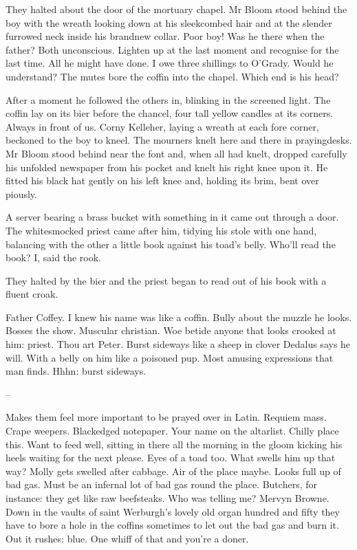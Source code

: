 They halted about the door of the mortuary chapel.
Mr Bloom stood behind the boy with the wreath
looking down at his sleekcombed hair and
at the slender furrowed neck inside his brandnew collar.
Poor boy!
Was he there when the father?
Both unconscious.
Lighten up at the last moment and recognise for the last time.
All he might have done.
I owe three shillings to O'Grady.
Would he understand?
The mutes bore the coffin into the chapel.
Which end is his head?

After a moment he followed the others in,
blinking in the screened light.
The coffin lay on its bier before the chancel,
four tall yellow candles at its corners.
Always in front of us.
Corny Kelleher, laying a wreath at each fore corner,
beckoned to the boy to kneel.
The mourners knelt here and there in prayingdesks.
Mr Bloom stood behind near the font
and, when all had knelt,
dropped carefully his unfolded newspaper from his pocket
and knelt his right knee upon it.
He fitted his black hat gently on his left knee
and, holding its brim, bent over piously.

A server bearing a brass bucket with something in it came out through a door.
The whitesmocked priest came after him,
tidying his stole with one hand,
balancing with the other a little book against his toad's belly.
Who'll read the book?
I, said the rook.

They halted by the bier
and the priest began to read out of his book
with a fluent croak.

Father Coffey.
I knew his name was like a coffin.
Bully about the muzzle he looks.
Bosses the show.
Muscular christian.
Woe betide anyone that looks crooked at him:
priest.
Thou art Peter.
Burst sideways like a sheep in clover
Dedalus says he will.
With a belly on him like a poisoned pup.
Most amusing expressions that man finds.
Hhhn:
burst sideways.

--

Makes them feel more important to be prayed over in Latin.
Requiem mass.
Crape weepers.
Blackedged notepaper.
Your name on the altarlist.
Chilly place this.
Want to feed well, sitting in there all the morning
in the gloom kicking his heels
waiting for the next please.
Eyes of a toad too.
What swells him up that way?
Molly gets swelled after cabbage.
Air of the place maybe.
Looks full up of bad gas.
Must be an infernal lot of bad gas round the place.
Butchers, for instance:
they get like raw beefsteaks.
Who was telling me?
Mervyn Browne.
Down in the vaults of saint Werburgh's
lovely old organ hundred and fifty
they have to bore a hole in the coffins
sometimes to let out the bad gas and burn it.
Out it rushes:
blue.
One whiff of that and you're a doner.

